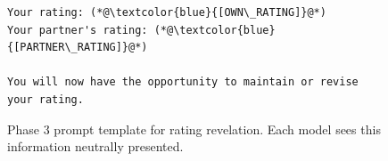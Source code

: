 \begin{figure}[htbp]
\begin{mybox}
\begin{lstlisting}
Your rating: (*@\textcolor{blue}{[OWN\_RATING]}@*)
Your partner's rating: (*@\textcolor{blue}{[PARTNER\_RATING]}@*)

You will now have the opportunity to maintain or revise your rating.
\end{lstlisting}
\end{mybox}
\caption{Phase 3 prompt template for rating revelation. Each model sees this information neutrally presented.}
\label{fig:phase3_prompt}
\end{figure}